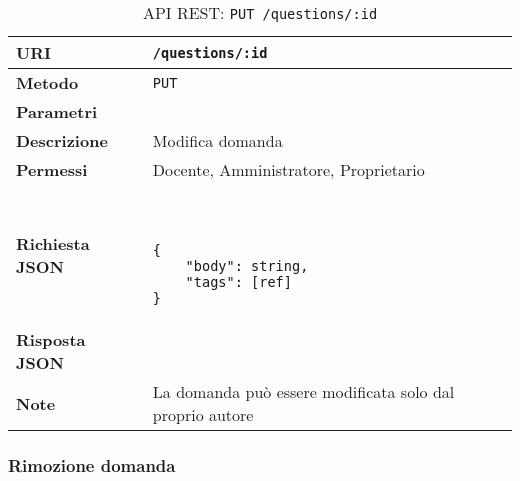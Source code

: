         \begin{table}[H]
            \begin{center}
                \begin{tabular}{p{} p{}}
                    \toprule
                    \textbf{URI} & \texttt{/questions/:id} \\ \midrule
                    \textbf{Metodo} & \texttt{PUT} \\ \midrule
                    \textbf{Parametri} & \\ \midrule
                    \textbf{Descrizione} & Modifica domanda \\ \midrule
                    \textbf{Permessi} & Docente, Amministratore, Proprietario  \\ \midrule
                    \textbf{Richiesta JSON} & \
                        \begin{lstlisting}[basicstyle={\ttfamily}]
{
    "body": string,
    "tags": [ref]
}
                        \end{lstlisting}
                        \\ \midrule
                    \textbf{Risposta JSON} & \\ \midrule
                    \textbf{Note} & La domanda può essere modificata solo dal proprio autore \\
                    \bottomrule
                \end{tabular}
                \caption{API REST: \texttt{PUT /questions/:id}}
            \end{center}
        \end{table}

    \subsubsection{Rimozione domanda}

